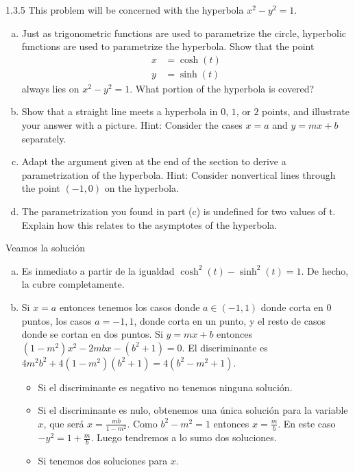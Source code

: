 \documentclass[twoside]{article}
\begin{document}
\begin{ejercicio}{1.3.5}
This problem will be concerned with the hyperbola $x^2 − y^2 = 1$.
\begin{enumerate}[a)]
\item Just as trigonometric functions are used to parametrize the circle, hyperbolic functions are used to parametrize the hyperbola. Show that the point
\begin{align*}
x&=\cosh(t)\\
y&=\sinh(t)
\end{align*}
always lies on $x^2 − y^2 = 1$. What portion of the hyperbola is covered?
\item Show that a straight line meets a hyperbola in $0$, $1$, or $2$ points, and illustrate your
answer with a picture. Hint: Consider the cases $x = a$ and $y = mx + b$ separately.
\item Adapt the argument given at the end of the section to derive a parametrization of the hyperbola. Hint: Consider nonvertical lines through the point $(−1, 0)$ on the hyperbola.
\item The parametrization you found in part (c) is undefined for two values of t. Explain how this relates to the asymptotes of the hyperbola.
\end{enumerate}
\end{ejercicio}
\begin{solucion}
Veamos la solución
\begin{enumerate}[a)]
\item Es inmediato a partir de la igualdad $\cosh^2(t)
-\sinh^2(t)=1$. De hecho, la cubre completamente.
\item Si $x=a$ entonces tenemos los casos donde $a\in(-1,1)$ donde corta en 0 puntos, los casos $a=-1,1$, donde corta en un punto, y el resto de casos donde se cortan en dos puntos. Si $y=mx+b$ entonces $(1-m^2)x^2-2mbx-(b^2+1)=0$. El discriminante es $4m^2b^2+4(1-m^2)(b^2+1) = 4(b^2-m^2+1)$. 
\begin{itemize}
\item Si el discriminante es negativo no tenemos ninguna solución.
\item Si el discriminante es nulo, obtenemos una única solución para la variable $x$, que será $x=\frac{mb}{1-m^2}$. Como $b^2-m^2 =1$ entonces $x= \frac{m}{b}$. En este caso $-y^2 = 1 + \frac{m}{b}$. Luego tendremos a lo sumo dos soluciones.
\item Si tenemos dos soluciones para $x$.  
\end{itemize}
\end{enumerate}
\end{solucion}
\end{document}
